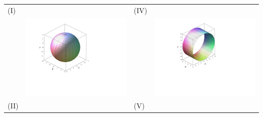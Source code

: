 \documentclass[12pt]{article}
\begin{document}
\begin{enumerate}
\begin{center}
\begin{tabular}{|lc|lc|}
\hline
(I) & & (IV)&\\
&\includegraphics[scale=0.4]{matching3.pdf}&&\includegraphics[scale=0.4]{matching4.pdf}\\
\hline
(II) & & (V)&\\

\end{tabular}
\end{center}
\end{enumerate}
\end{document}
